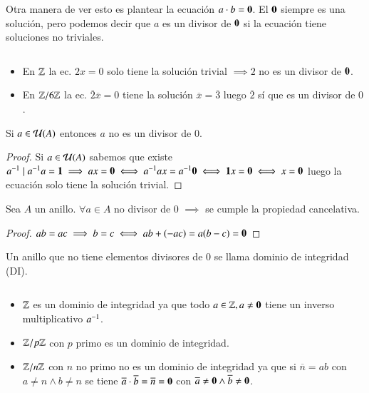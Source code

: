Otra manera de ver esto es plantear la ecuación $a \cdot b = \mathbf{0}$. El $\mathbf{0}$ siempre es una solución, pero podemos decir que $a$ es un divisor de $\mathbf{0}$ si la ecuación tiene soluciones no triviales.

\begin{ej}$ $\newline
	\begin{itemize}
		\item En $\mathbb{Z}$ la ec. $2x = 0$ solo tiene la solución trivial $\implies 2$ no es un divisor de $\mathbf{0}$.
		\item En $\mathbb{Z}/6\mathbb{Z}$ la ec. $\overline{2}\overline{x} = 0$ tiene la solución $\overline{x} = \overline{3}$ luego $\overline{2}$ sí que es un divisor de $0$.
	\end{itemize}
\end{ej}

\begin{pro}
	Si $a \in \mathcal{U}(A)$ entonces $a$ no es un divisor de $0$.
\end{pro}

\begin{proof}
	Si $a \in \mathcal{U}(A)$ sabemos que existe $a^{-1} \mid a^{-1}a = \mathbf{1} \implies ax = \mathbf{0} \iff a^{-1}ax = a^{-1} \mathbf{0} \iff \mathbf{1} x = \mathbf{0} \iff x = \mathbf{0}$ luego la ecuación solo tiene la solución trivial.
\end{proof}

\begin{pro}
	Sea $A$ un anillo. $\forall a \in A$ no divisor de 0 $\implies$ se cumple la propiedad cancelativa.
\end{pro}

\begin{proof}
	$ab = ac \implies b = c \iff ab + (-ac) = a(b -c) = \mathbf{0}$
\end{proof}

\begin{dfn}
	Un anillo que no tiene elementos divisores de 0 se llama dominio de integridad (DI).
\end{dfn}

\begin{ej}$ $\newline
	\begin{itemize}
		\item $\mathbb{Z}$ es un dominio de integridad ya que todo $a \in \mathbb{Z}, a \neq \mathbf{0}$ tiene un inverso multiplicativo $a^{-1}$.
		\item $\mathbb{Z}/p\mathbb{Z}$ con $p$ primo es un dominio de integridad.
		\item $\mathbb{Z}/n\mathbb{Z}$ con $n$ no primo no es un dominio de integridad ya que si $\overline n = ab$ con $a \neq n \land b \neq n$ se tiene $\overline{a} \cdot \overline{b} = \overline{n} = \mathbf{0}$ con $\overline{a} \neq \mathbf{0} \land \overline{b} \neq \mathbf{0}$.
	\end{itemize}
\end{ej}


